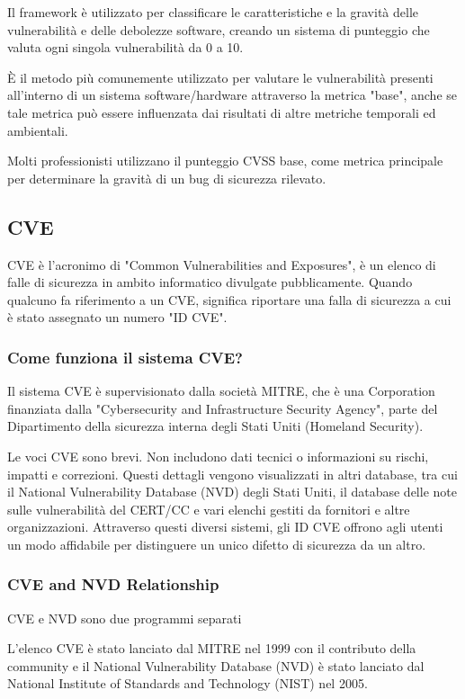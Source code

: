 \documentclass[a4paper,12pt]{article}
\begin{document}
Il framework è utilizzato per classificare le caratteristiche e la gravità delle vulnerabilità e delle debolezze software, creando un sistema di punteggio che valuta ogni singola vulnerabilità da 0 a 10.

È il metodo più comunemente utilizzato per valutare le vulnerabilità presenti all'interno di un sistema software/hardware attraverso la metrica "base", anche se tale metrica può essere influenzata dai risultati di altre metriche temporali ed ambientali.

Molti professionisti utilizzano il punteggio CVSS base, come metrica principale per determinare la gravità di un bug di sicurezza rilevato. 

\subsection{CVE}

CVE è l'acronimo di "Common Vulnerabilities and Exposures", è un elenco di falle di sicurezza in ambito informatico divulgate pubblicamente. Quando qualcuno fa riferimento a un CVE, significa riportare una falla di sicurezza a cui è stato assegnato un numero "ID CVE".


\subsubsection{Come funziona il sistema CVE?}
Il sistema CVE è supervisionato dalla società MITRE\cite{MITRE}, che è una Corporation finanziata dalla "Cybersecurity and Infrastructure Security Agency", parte del Dipartimento della sicurezza interna degli Stati Uniti (Homeland Security).

Le voci CVE sono brevi. Non includono dati tecnici o informazioni su rischi, impatti e correzioni. Questi dettagli vengono visualizzati in altri database, tra cui il National Vulnerability Database (NVD) degli Stati Uniti, il database delle note sulle vulnerabilità del CERT/CC e vari elenchi gestiti da fornitori e altre organizzazioni. Attraverso questi diversi sistemi, gli ID CVE offrono agli utenti un modo affidabile per distinguere un unico difetto di sicurezza da un altro.

\subsubsection{CVE and NVD Relationship\cite{MITRE}}

CVE e NVD sono due programmi separati

L'elenco CVE è stato lanciato dal MITRE nel 1999 con il contributo della community e il National Vulnerability Database (NVD) è stato lanciato dal National Institute of Standards and Technology (NIST) nel 2005.
\end{document}
